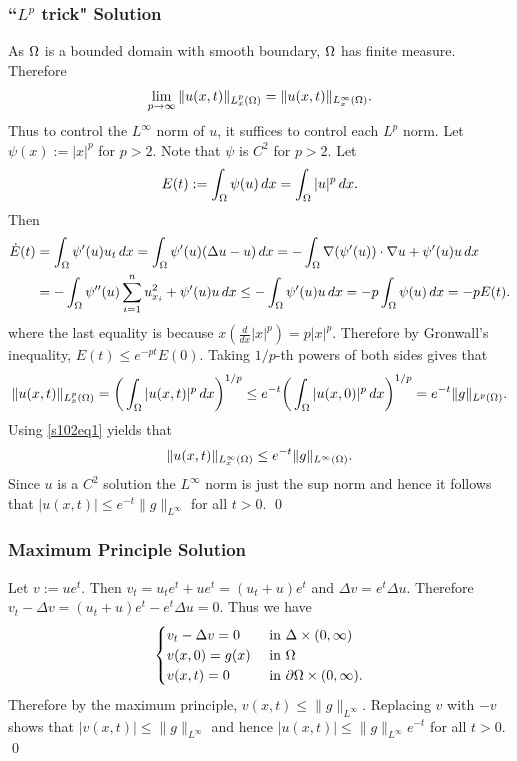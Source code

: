 \subsubsection*{``$L^{p}$ trick" Solution}
As $\Omega$ is a bounded domain with smooth boundary, $\Omega$ has finite measure. Therefore
\begin{align}\label{s102eq1}
\lim_{p \rightarrow \infty}\|u(x, t)\|_{L^{p}_{x}(\Omega)} = \|u(x, t)\|_{L^{\infty}_{x}(\Omega)}.
\end{align}
Thus to control the $L^{\infty}$ norm of $u$, it suffices to control each $L^{p}$ norm. Let $\psi(x) := |x|^{p}$ for $p > 2$.
Note that $\psi$ is $C^{2}$ for $p > 2$. Let $$E(t) := \int_{\Omega}\psi(u)\, dx = \int_{\Omega}|u|^{p}\, dx.$$
Then
\begin{align*}
\dot{E}(t) &= \int_{\Omega}\psi'(u)u_{t}\, dx = \int_{\Omega}\psi'(u)(\Delta u - u)\, dx = -\int_{\Omega}\nabla (\psi'(u)) \cdot \nabla u + \psi'(u)u\, dx\\
&= -\int_{\Omega}\psi''(u)\sum_{i = 1}^{n}u_{x_{i}}^{2} + \psi'(u)u\, dx \leq -\int_{\Omega}\psi'(u)u\, dx = -p\int_{\Omega}\psi(u)\, dx = -pE(t).
\end{align*}
where the last equality is because $x(\frac{d}{dx}|x|^{p}) = p|x|^{p}$. Therefore
by Gronwall's inequality, $E(t) \leq e^{-pt}E(0)$. Taking $1/p$-th powers of both sides gives that
$$\|u(x, t)\|_{L^{p}_{x}(\Omega)} = \bigg(\int_{\Omega}|u(x, t)|^{p}\, dx\bigg)^{1/p} \leq e^{-t}\bigg(\int_{\Omega}|u(x, 0)|^{p}\, dx\bigg)^{1/p} = e^{-t}\|g\|_{L^{p}(\Omega)}.$$
Using \eqref{s102eq1} yields that
$$\|u(x, t)\|_{L^{\infty}_{x}(\Omega)} \leq e^{-t}\|g\|_{L^{\infty}(\Omega)}.$$
Since $u$ is a $C^{2}$ solution the $L^{\infty}$ norm is just the sup norm and hence it follows that
$|u(x, t)| \leq e^{-t}\|g\|_{L^{\infty}}$ for all $t > 0$.
\hfill\qed

\subsubsection*{Maximum Principle Solution}
Let $v := ue^{t}$. Then $v_{t} = u_{t}e^{t} + ue^{t} = (u_{t} + u)e^{t}$
and $\Delta v = e^{t}\Delta u$. Therefore
$v_{t} - \Delta v = (u_{t} + u)e^{t} - e^{t}\Delta u = 0$. Thus we have
\begin{align*}
\begin{cases}
v_{t} - \Delta v = 0 & \text{ in } \Delta \times (0, \infty)\\
v(x, 0) = g(x) & \text{ in } \Omega\\
v(x, t) = 0 & \text{ in } \partial\Omega \times (0, \infty).
\end{cases}
\end{align*}
Therefore by the maximum principle, $v(x, t) \leq \|g\|_{L^{\infty}}$. Replacing $v$ with $-v$ shows that
$|v(x, t)| \leq \|g\|_{L^{\infty}}$ and hence $|u(x, t)| \leq \|g\|_{L^{\infty}}e^{-t}$ for all $t > 0$.
\hfill\qed

